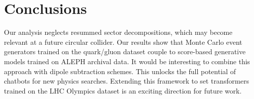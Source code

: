 \section{Conclusions}\label{sec:conclusions}

Our analysis neglects resummed sector decompositions, which may become
relevant at a future circular collider. Our results show that Monte
Carlo event generators trained on the quark/gluon dataset couple to
score-based generative models trained on ALEPH archival data. It would
be interesting to combine this approach with dipole subtraction schemes.
This unlocks the full potential of chatbots for new physics searches.
Extending this framework to set transformers trained on the LHC Olympics
dataset is an exciting direction for future work.

